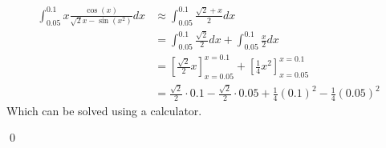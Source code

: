 \begin{solution}
    \begin{align*}
         \int_{0.05}^{0.1} x\frac{\cos(x)}{\sqrt{2}x - \sin(x^2)} dx &\approx \int_{0.05}^{0.1} \frac{\sqrt{2} + x}{2} dx \\
         &= \int_{0.05}^{0.1} \frac{\sqrt{2}}{2}dx + \int_{0.05}^{0.1}  \frac{x}{2} dx \tag{splitting the integral} \\
         &= \left[\frac{\sqrt{2}}{2}x\right]_{x=0.05}^{x=0.1} + \left[ \frac{1}{4}x^2 \right]_{x=0.05}^{x=0.1} \tag{integrating the parts} \\
         &= \frac{\sqrt{2}}{2}\cdot0.1 - \frac{\sqrt{2}}{2}\cdot0.05 +  \frac{1}{4}(0.1)^2 -  \frac{1}{4}(0.05)^2
    \end{align*}
    Which can be solved using a calculator.

    \qed
\end{solution}

